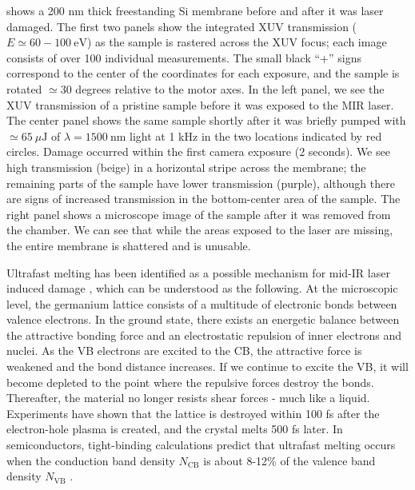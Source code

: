  shows a 200 nm thick freestanding Si membrane before and after it was laser damaged. The first two panels show the integrated XUV transmission ($E \simeq 60-100 \ \textrm{eV}$) as the sample is rastered across the XUV focus; each image consists of over 100 individual measurements. The small black ``+'' signs correspond to the center of the coordinates for each exposure, and the sample is rotated $\simeq 30$ degrees relative to the motor axes. In the left panel, we see the XUV transmission  of a pristine sample before it was exposed to the MIR laser. The center panel shows the same sample shortly after it was briefly pumped with $\simeq 65 \ \mu \textrm{J}$ of $\lambda=1500 \ \textrm{nm}$ light at 1 kHz in the two locations indicated by red circles. Damage occurred within the first camera exposure (2 seconds). We see high transmission (beige) in a horizontal stripe across the membrane; the remaining parts of the sample have lower transmission (purple), although there are signs of increased transmission in the bottom-center area of the sample. The right panel shows a microscope image of the sample after it was removed from the chamber. We can see that while the areas exposed to the laser are missing, the entire membrane is shattered and is unusable.

Ultrafast melting has been identified as a possible mechanism for mid-IR laser induced damage \cite{austinSemiconductorSurfaceModification2017,austinFemtosecondLaserDamage2018}, which can be understood as the following. At the microscopic level, the germanium lattice consists of a multitude of electronic bonds between valence electrons. In the ground state, there exists an energetic balance between the attractive bonding force and an electrostatic repulsion of inner electrons and nuclei. As the VB electrons are excited to the CB, the attractive force is weakened and the bond distance increases. If we continue to excite the VB, it will become depleted to the point where the repulsive forces destroy the bonds. Thereafter, the material no longer resists shear forces - much like a liquid. Experiments have shown that the lattice is destroyed within 100 fs after the electron-hole plasma is created, and the crystal melts 500 fs later. In semiconductors, tight-binding calculations predict that ultrafast melting occurs when the conduction band density $N_{\textrm{CB}}$ is about 8-12\% of the valence band density $N_{\textrm{VB}}$ \cite{stampfliTheoryLaserinducedInstability1990,austinFemtosecondLaserDamage2018}.

